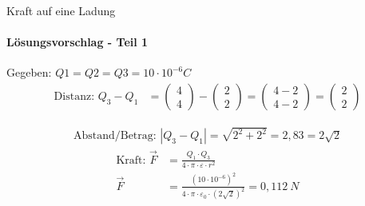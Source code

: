 \begin{frame}{Kraft auf eine Ladung}
\framesubtitle{Lösungsvorschlag - Teil 1}
Gegeben: $Q1 = Q2 = Q3 = 10 \cdot 10^{-6}C$ \\
\begin{align}
    \text{Distanz: }Q_3-Q_1  &= \left(\begin{array}{c} 4 \\ 4 \end{array}\right)- \left(\begin{array}{c} 2 \\ 2 \end{array}\right)
= \left(\begin{array}{c} 4-2 \\ 4-2 \end{array}\right)= \left(\begin{array}{c} 2 \\ 2 \end{array}\right)
\end{align}

\begin{align}
   \text{Abstand/Betrag: } |Q_3-Q_1| =\sqrt{2^2+2^2}=2,83=2\sqrt{2}
\end{align}
\begin{align}
 \text{Kraft: } \vec{F} &= \frac{Q_1 \cdot Q_3}{4 \cdot \pi \cdot \varepsilon\cdot r^2}
 \\
 \vec{F} &= \frac{(10\cdot 10^{-6})^2}{4 \cdot \pi \cdot \varepsilon_0\cdot (2\sqrt{2})^2}=0,112\ N
 \end{align}
\end{frame}


